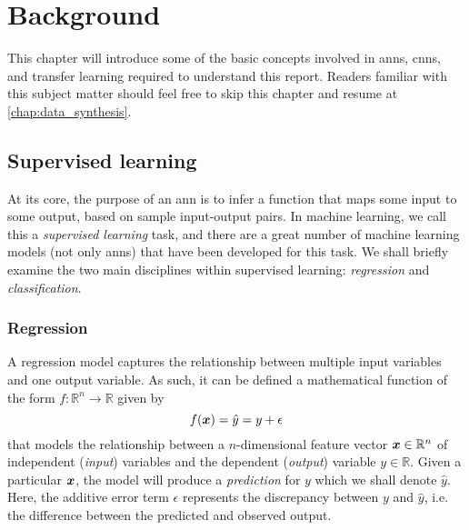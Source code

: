 \documentclass[../main.tex]{subfiles}
\begin{document}
\chapter{Background}
This chapter will introduce some of the basic concepts involved in \glspl{ann}, \glspl{cnn}, and transfer learning required to understand this report.
Readers familiar with this subject matter should feel free to skip this chapter and resume at \cref{chap:data_synthesis}.

\section{Supervised learning}
At its core, the purpose of an \gls{ann} is to infer a function that maps some input to some output, based on sample input-output pairs.
In machine learning, we call this a \emph{supervised learning} task, and there are a great number of machine learning models (not only \glspl{ann}) that have been developed for this task.
We shall briefly examine the two main disciplines within supervised learning: \emph{regression} and \emph{classification}.

\subsection{Regression}
\label{sec:regression}
A regression model captures the relationship between multiple input variables and one output variable. 
As such, it can be defined a mathematical function of the form $f:\mathbb{R}^n\rightarrow \mathbb{R}$ given by
\begin{equation}
    \label{eq:reg_model}
    f({\bm{x}}) = \hat{y} = y + \epsilon
\end{equation}
that models the relationship between a $n$-dimensional feature vector ${\bm{x}} \in \mathbb{R}^n$ of independent (\emph{input}) variables and the dependent (\emph{output}) variable $y \in \mathbb{R}$. 
Given a particular ${\bm{x}}$, the model will produce a \emph{prediction} for $y$ which we shall denote $\hat{y}$.
Here, the additive error term $\epsilon$ represents the discrepancy between $y$ and $\hat{y}$, i.e. the difference between the predicted and observed output.
\end{document}
